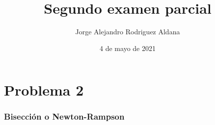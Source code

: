 \documentclass{beamer}
\title{Segundo examen parcial}
\date{4 de mayo de 2021}
\author{Jorge Alejandro Rodriguez Aldana}
\institute{Escuela de Ciencias físicas y matemáticas}
\begin{document}
\maketitle
\section{Problema 2}

\begin{frame}
    \frametitle{Bisección o Newton-Rampson}

    

\end{frame}

{ 
\begin{frame}

\end{frame}}
\end{document}
